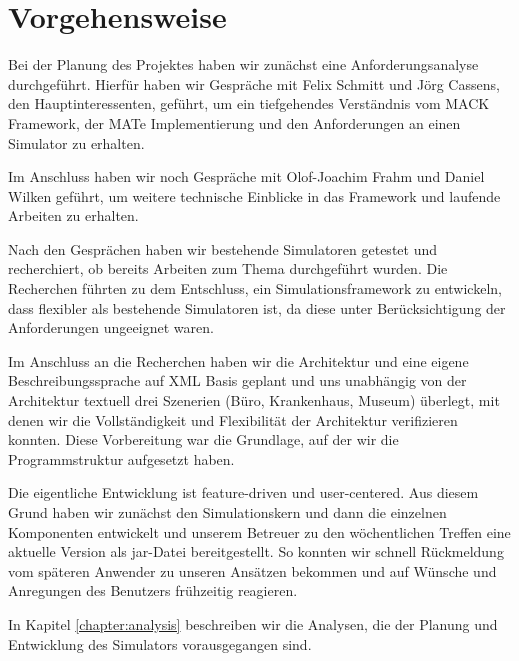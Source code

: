 
\section{Vorgehensweise}\label{sec:approach}
Bei der Planung des Projektes haben wir zunächst eine Anforderungsanalyse durchgeführt. Hierfür haben wir Gespräche mit Felix Schmitt und Jörg Cassens, den Hauptinteressenten, geführt, um ein tiefgehendes Verständnis vom MACK Framework, der MATe Implementierung und den Anforderungen an einen Simulator zu erhalten.

Im Anschluss haben wir noch Gespräche mit Olof-Joachim Frahm und Daniel Wilken geführt, um weitere technische Einblicke in das Framework und laufende Arbeiten zu erhalten.

Nach den Gesprächen haben wir bestehende Simulatoren getestet und recherchiert, ob bereits Arbeiten zum Thema durchgeführt wurden. Die Recherchen führten zu dem Entschluss, ein Simulationsframework zu entwickeln, dass flexibler als bestehende Simulatoren ist, da diese unter Berücksichtigung der Anforderungen ungeeignet waren.

Im Anschluss an die Recherchen haben wir die Architektur und eine eigene Beschreibungssprache auf XML Basis geplant und uns unabhängig von der Architektur textuell drei Szenerien (Büro, Krankenhaus, Museum) überlegt, mit denen wir die Vollständigkeit und Flexibilität der Architektur verifizieren konnten. Diese Vorbereitung war die Grundlage, auf der wir die Programmstruktur aufgesetzt haben.

Die eigentliche Entwicklung ist feature-driven und user-centered. Aus diesem Grund haben wir zunächst den Simulationskern und dann die einzelnen Komponenten entwickelt und unserem Betreuer zu den wöchentlichen Treffen eine aktuelle Version als jar-Datei bereitgestellt. So konnten wir schnell Rückmeldung vom späteren Anwender zu unseren Ansätzen bekommen und auf Wünsche und Anregungen des Benutzers frühzeitig reagieren.



In Kapitel \ref{chapter:analysis} beschreiben wir die Analysen, die der Planung und Entwicklung des Simulators vorausgegangen sind.

